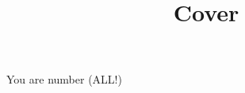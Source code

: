 \documentclass{article}
\title{Cover}
\begin{document}
\maketitle

You are number {\Huge\tagnumber} (ALL!)

\filetotag
\end{document}
